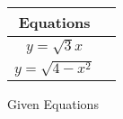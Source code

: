 \begin{tabular}[12pt]{ |c| c|}
    \hline
    \textbf{Equations}\\ 
    \hline
     $y=\sqrt{3}x$ \\
    \hline 
     $y=\sqrt{4-x^2}$\\
    \hline
    \end{tabular}
    \caption{Given Equations}

